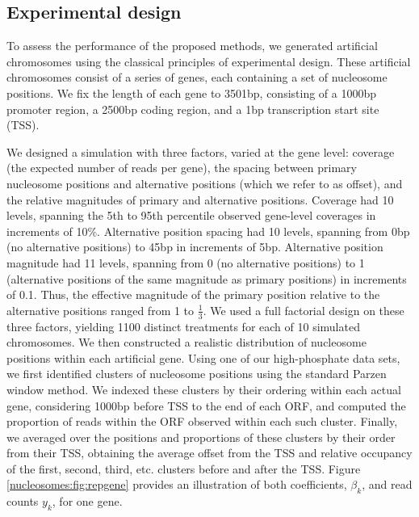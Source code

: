 \subsection{Experimental design}
\label{nucleosomes:sec:design}

To assess the performance of the proposed methods, we generated  artificial chromosomes using the classical principles of experimental design.
These artificial chromosomes consist of a series of genes, each containing a set of nucleosome positions.
We fix the length of each gene to 3501bp, consisting of a 1000bp promoter region, a 2500bp coding region, and a 1bp transcription start site (TSS).

We designed a simulation with three factors, varied at the gene level: coverage (the expected number of reads per gene), the spacing between primary nucleosome positions and alternative positions (which we refer to as offset), and the relative magnitudes of  primary and alternative positions.
Coverage had 10 levels, spanning the 5th to 95th percentile observed gene-level coverages in increments of 10\%.
Alternative position spacing had 10 levels, spanning from 0bp (no alternative positions) to 45bp in increments of 5bp.
Alternative position magnitude had 11 levels, spanning from 0 (no alternative positions) to 1 (alternative positions of the same magnitude as primary positions) in increments of 0.1.
Thus, the effective magnitude of the primary position relative to the alternative positions ranged from 1 to $\frac{1}{3}$.
We used a full factorial design on these three factors, yielding 1100 distinct treatments for each of 10 simulated chromosomes.
%
We then constructed a realistic distribution of nucleosome positions within each artificial gene.
Using one of our high-phosphate data sets, we first identified clusters of nucleosome positions using the standard Parzen window method.
We indexed these clusters by their ordering within each actual gene, considering 1000bp before TSS to the end of each ORF, and computed the proportion of reads within the ORF observed within each such cluster.
Finally, we averaged over the positions and proportions of these clusters by their order from their TSS, obtaining the average offset from the TSS and relative occupancy of the first, second, third, etc. clusters before and after the TSS.
Figure \ref{nucleosomes:fig:repgene} provides an illustration of both coefficients, $\beta_k$, and read counts $y_k$, for one gene.

